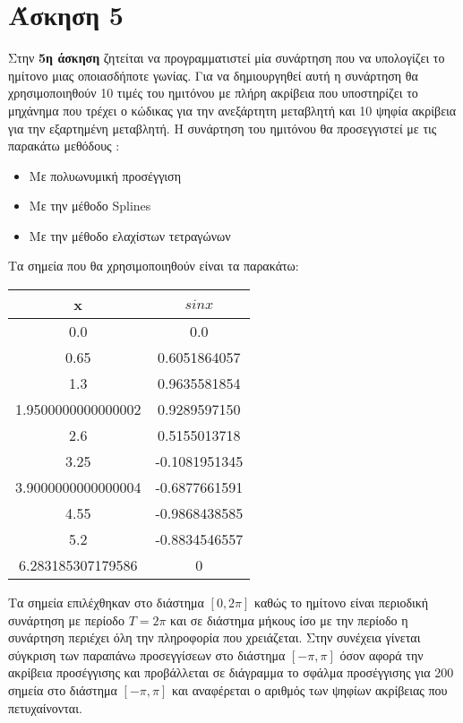 \documentclass[Second Project.tex]{subfiles}
\begin{document}
\section{ Άσκηση 5 }
Στην \textbf{5η άσκηση} ζητείται να προγραμματιστεί μία συνάρτηση που να υπολογίζει το ημίτονο μιας οποιασδήποτε γωνίας.
Για να δημιουργηθεί αυτή η συνάρτηση θα χρησιμοποιηθούν 10 τιμές του ημιτόνου με πλήρη ακρίβεια που υποστηρίζει το μηχάνημα που τρέχει ο κώδικας
για την ανεξάρτητη μεταβλητή και 10 ψηφία ακρίβεια για την εξαρτημένη μεταβλητή. Η συνάρτηση του ημιτόνου θα προσεγγιστεί με τις παρακάτω 
μεθόδους :
\begin{itemize}
    \item Με πολυωνυμική προσέγγιση
    \item Με την μέθοδο \textlatin{Splines}
    \item Με την μέθοδο ελαχίστων τετραγώνων
\end{itemize}

Τα σημεία που θα χρησιμοποιηθούν είναι τα παρακάτω: 
\begin{center}
    \begin{tabular}{ |c|c| } 
    \hline
    \textlatin{x} & $sinx$ \\ \hline
    0.0 & 0.0 \\ \hline
    0.65 & 0.6051864057 \\ \hline
    1.3 & 0.9635581854 \\  \hline
    1.9500000000000002 & 0.9289597150 \\ \hline
    2.6 & 0.5155013718 \\  \hline
    3.25 & -0.1081951345 \\ \hline
    3.9000000000000004 & -0.6877661591 \\ \hline
    4.55 & -0.9868438585 \\ \hline
    5.2 & -0.8834546557 \\ \hline
    6.283185307179586 & 0 \\
    \hline
    \end{tabular}
\end{center}

Τα σημεία επιλέχθηκαν στο διάστημα $[0,2\pi]$ καθώς το ημίτονο είναι περιοδική συνάρτηση με περίοδο $Τ = 2\pi$ και σε 
διάστημα μήκους ίσο με την περίοδο η συνάρτηση περιέχει όλη την πληροφορία που χρειάζεται.
Στην συνέχεια γίνεται σύγκριση των παραπάνω προσεγγίσεων στο διάστημα $[-\pi , \pi]$ όσον αφορά την ακρίβεια 
προσέγγισης και προβάλλεται σε διάγραμμα το σφάλμα προσέγγισης για 200 σημεία στο διάστημα $[-\pi , \pi]$ και 
αναφέρεται ο αριθμός των ψηφίων ακρίβειας που πετυχαίνονται.
\end{document}
